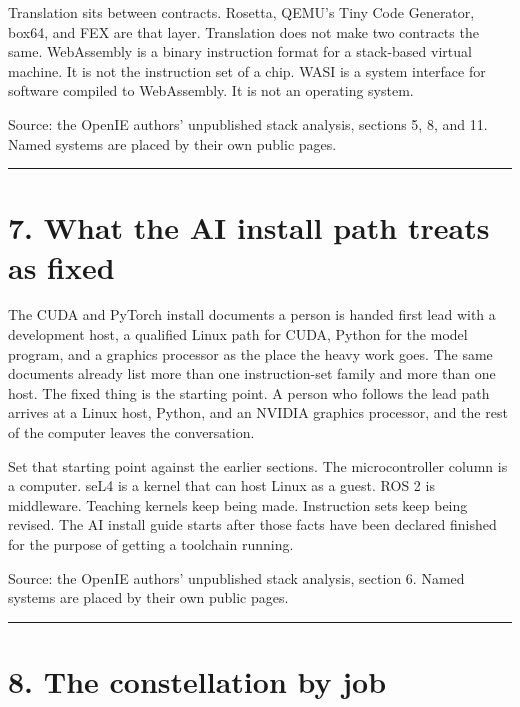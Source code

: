 \documentclass[10pt,letterpaper]{article}
\begin{document}
Translation sits between contracts. Rosetta, QEMU's Tiny Code Generator,
box64, and FEX are that layer. Translation does not make two contracts
the same. WebAssembly is a binary instruction format for a stack-based
virtual machine. It is not the instruction set of a chip. WASI is a
system interface for software compiled to WebAssembly. It is not an
operating system.

Source: the OpenIE authors' unpublished stack analysis, sections 5, 8,
and 11. Named systems are placed by their own public pages.

\begin{center}\rule{0.5\linewidth}{0.5pt}\end{center}

\section{7. What the AI install path treats as
fixed}\label{what-the-ai-install-path-treats-as-fixed}

The CUDA and PyTorch install documents a person is handed first lead
with a development host, a qualified Linux path for CUDA, Python for the
model program, and a graphics processor as the place the heavy work
goes. The same documents already list more than one instruction-set
family and more than one host. The fixed thing is the starting point. A
person who follows the lead path arrives at a Linux host, Python, and an
NVIDIA graphics processor, and the rest of the computer leaves the
conversation.

Set that starting point against the earlier sections. The
microcontroller column is a computer. seL4 is a kernel that can host
Linux as a guest. ROS 2 is middleware. Teaching kernels keep being made.
Instruction sets keep being revised. The AI install guide starts after
those facts have been declared finished for the purpose of getting a
toolchain running.

Source: the OpenIE authors' unpublished stack analysis, section 6. Named
systems are placed by their own public pages.

\begin{center}\rule{0.5\linewidth}{0.5pt}\end{center}

\section{8. The constellation by job}\label{the-constellation-by-job}
\end{document}
